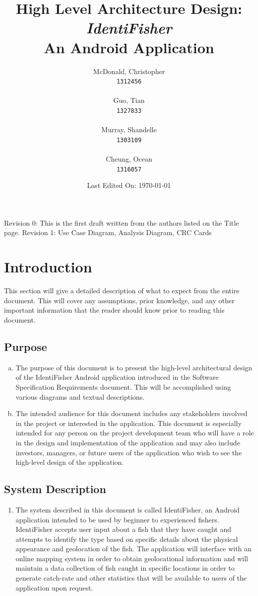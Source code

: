 \documentclass[]{article}
\title{High Level Architecture Design: \\ \textit{IdentiFisher} \\ An Android Application \\}
\author{
\Large McDonald, Christopher\\
\texttt{1312456} \\ \\
\Large Guo, Tian\\
\texttt{1327833} \\ \\
\Large Murray, Shandelle\\
\texttt{1303109} \\ \\
\Large Cheung, Ocean\\
\texttt{1316057} \\
}
\date{Last Edited On: \today}
\begin{document}
\maketitle

\newpage
\tableofcontents
\vfill
Revision 0: This is the first draft written from the authors listed on the Title page.
Revision 1: Use Case Diagram, Analysis Diagram, CRC Cards
\pagebreak

\section{Introduction}
\label{sec:introduction}
This section will give a detailed description of what to expect from the entire document. This will cover any assumptions, prior knowledge, and any other important information that the reader should know prior to reading this document.

\subsection{Purpose}
\label{sub:purpose}
\begin{enumerate}[a)]
	\item
	The purpose of this document is to present the high-level architectural design of the IdentiFisher Android application introduced in the Software Specification Requirements document. This will be accomplished using various diagrams and textual descriptions.
	\item
	The intended audience for this document includes any stakeholders involved in the project or interested in the application. This document is especially intended for any person on the project development team who will have a role in the design and implementation of the application and may also include investors, managers, or future users of the application who wish to see the high-level design of the application.
\end{enumerate}

\subsection{System Description}
\label{sub:system_description}
\begin{enumerate}[]
	\item
	The system described in this document is called IdentiFisher, an Android application intended to be used by beginner to experienced fishers. IdentiFisher accepts user input about a fish that they have caught and attempts to identify the type based on specific details about the physical appearance and geolocation of the fish. The application will interface with an online mapping system in order to obtain geolocational information and will maintain a data collection of fish caught in specific locations in order to generate catch-rate and other statistics that will be available to users of the application upon request.
\end{enumerate}
\end{document}
